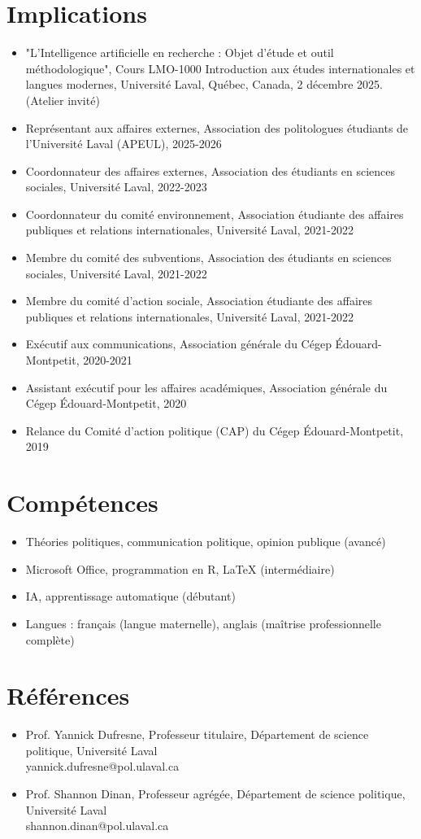 \documentclass[11pt,letterpaper,sans]{moderncv}        %
\begin{document}
\section{Implications}
\begin{itemize}
    \item "L'Intelligence artificielle en recherche : Objet d'étude et outil méthodologique", Cours LMO-1000 Introduction aux études internationales et langues modernes, Université Laval, Québec, Canada, 2 décembre 2025. (Atelier invité)
    \item Représentant aux affaires externes, Association des politologues étudiants de l'Université Laval (APEUL), 2025-2026
  \item Coordonnateur des affaires externes, Association des étudiants en sciences sociales, Université Laval, 2022-2023
  \item Coordonnateur du comité environnement, Association étudiante des affaires publiques et relations internationales, Université Laval, 2021-2022
  \item Membre du comité des subventions, Association des étudiants en sciences sociales, Université Laval, 2021-2022
  \item Membre du comité d'action sociale, Association étudiante des affaires publiques et relations internationales, Université Laval, 2021-2022
  \item Exécutif aux communications, Association générale du Cégep Édouard-Montpetit, 2020-2021
  \item Assistant exécutif pour les affaires académiques, Association générale du Cégep Édouard-Montpetit, 2020
  \item Relance du Comité d'action politique (CAP) du Cégep Édouard-Montpetit, 2019
\end{itemize}

\section{Compétences}
\begin{itemize}
  \item Théories politiques, communication politique, opinion publique (avancé)
  \item Microsoft Office, programmation en R, \LaTeX{} (intermédiaire)
  \item IA, apprentissage automatique (débutant)
  \item Langues : français (langue maternelle), anglais (maîtrise professionnelle complète)
\end{itemize}

\section{Références}
\begin{itemize}
  \item Prof. Yannick Dufresne, Professeur titulaire, Département de science politique, Université Laval\\
     yannick.dufresne@pol.ulaval.ca
  \item Prof. Shannon Dinan, Professeur agrégée, Département de science politique, Université Laval\\
 shannon.dinan@pol.ulaval.ca
\end{itemize}
\end{document}
